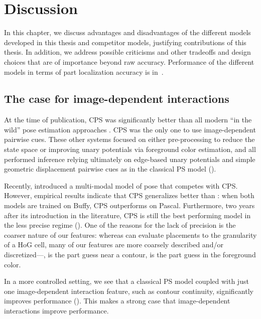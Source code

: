 \chapter{Discussion}\label{sec:discussion}

In this chapter, we discuss advantages and disadvantages of the different 
models developed in this thesis and competitor models, justifying contributions 
of this thesis.  In addition, we address possible criticisms and other 
tradeoffs and design choices that are of importance beyond raw accuracy.  
Performance of the different models in terms of part localization accuracy is 
in~.

\section{The case for image-dependent interactions}

At the time of publication, CPS was significantly better than all modern ``in 
the wild'' pose estimation approaches 
\citep{ferrari08,eichner09,devacrf,andriluka09}.  CPS was the only one to use 
image-dependent pairwise cues.  These other systems focused on either 
pre-processing to reduce the state space or improving unary potentials via 
foreground color estimation, and all performed inference relying ultimately on 
edge-based unary potentials and simple geometric displacement pairwise cues as 
in the classical PS model ().


Recently, \citet{deva2011} introduced a multi-modal model of pose that competes 
with CPS. However, empirical results indicate that CPS generalizes better than 
\citet{deva2011}: when both models are trained on Buffy, CPS outperforms 
\citet{deva2011} on Pascal. Furthermore, two years after its introduction in 
the literature, CPS is still the best performing model in the less precise 
regime ().  One of the reasons for the lack of 
precision is the coarser nature of our features: whereas \citet{deva2011} can 
evaluate placements to the granularity of a HoG cell, many of our features are 
more coarsely described and/or discretized---\eg, is the part guess near a 
contour, is the part guess in the foreground color.

In a more controlled setting, we see that a classical PS model coupled with 
just one image-dependent interaction feature, such as contour continuity, 
significantly improves performance ().  This makes a strong 
case that image-dependent interactions improve performance.

